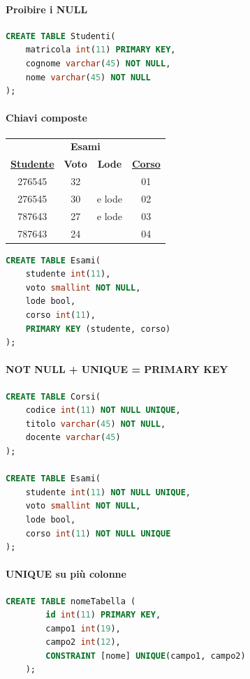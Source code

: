 \documentclass[12pt,a4paper]{article}
\begin{document}
\paragraph{Proibire i NULL}
\flushleft
\begin{lstlisting}[language = SQL]
CREATE TABLE Studenti(
	matricola int(11) PRIMARY KEY,
	cognome varchar(45) NOT NULL,
	nome varchar(45) NOT NULL
);
\end{lstlisting}

\paragraph{Chiavi composte}
\begin{center}
\begin{tabular}{cccc}
\multicolumn{4}{c}{\textbf{Esami}} \\
{\underline{\textbf{Studente}}} & \textbf{Voto} & \textbf{Lode} & {\underline{\textbf{Corso}}} \\ \hline
276545 & 32 & & 01 \\
276545 & 30 & e lode & 02 \\
787643 & 27 & e lode & 03 \\
787643 & 24 &  & 04\\ \hline
\end{tabular}\end{center}
\Sep \noindent
\begin{lstlisting}[language = SQL]
CREATE TABLE Esami(
	studente int(11),
	voto smallint NOT NULL,
	lode bool,
	corso int(11),
	PRIMARY KEY (studente, corso)
);
\end{lstlisting}

\paragraph{NOT NULL + UNIQUE = PRIMARY KEY}
\flushleft
\begin{lstlisting}[language = SQL]
CREATE TABLE Corsi(
	codice int(11) NOT NULL UNIQUE,
	titolo varchar(45) NOT NULL,
	docente varchar(45)
);

CREATE TABLE Esami(
	studente int(11) NOT NULL UNIQUE,
	voto smallint NOT NULL,
	lode bool,
	corso int(11) NOT NULL UNIQUE
);
\end{lstlisting}

\paragraph{UNIQUE su più colonne}
\flushleft
\begin{lstlisting}[language=SQL]
CREATE TABLE nomeTabella (
        id int(11) PRIMARY KEY,
        campo1 int(19),
        campo2 int(12),
        CONSTRAINT [nome] UNIQUE(campo1, campo2)
    );
\end{lstlisting}
\end{document}

